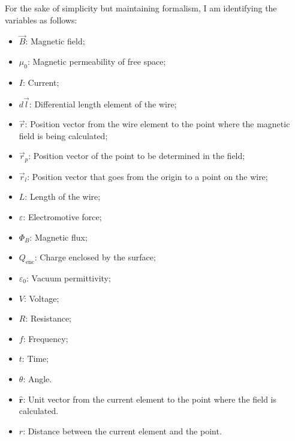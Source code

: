 \documentclass[10pt]{article}
\begin{document}
	For the sake of simplicity but maintaining formalism, I am identifying the variables
	as follows:
	\begin{itemize}
		\item {$\vec{B}$: Magnetic field;}

		\item {$\mu_{0}$: Magnetic permeability of free space;}

		\item {$I$: Current;}

		\item {$d\vec{l}$: Differential length element of the wire;}

		\item {$\vec{r}$: Position vector from the wire element to the point where the magnetic field is being calculated;}

		\item {$\vec{r}_{p}$: Position vector of the point to be determined in the field;}

		\item {$\vec{r}_{l}$: Position vector that goes from the origin to a point on the wire;}

		\item {$L$: Length of the wire;}

		\item {$\varepsilon$: Electromotive force;}

		\item {$\Phi_{B}$: Magnetic flux;}

		\item {$Q_{\text{enc}}$: Charge enclosed by the surface;}

		\item {$\varepsilon_{0}$: Vacuum permittivity;}

		\item {$V$: Voltage;}

		\item {$R$: Resistance;}

		\item {$f$: Frequency;}

		\item {$t$: Time;}

		\item {$\theta$: Angle.}

		\item {$\hat{\mathbf{r}}$: Unit vector from the current element to the point where the field is calculated.}

		\item {$r$: Distance between the current element and the point.}


\end{itemize}
\end{document}
